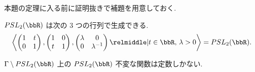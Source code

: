 \documentclass[openany, a4paper, oneside]{jsbook}
\begin{document}
本題の定理に入る前に証明抜きで補題を用意しておく.
\begin{lem}\label{introduction-to-ergodic-theory7}
$PSL_2 (\bbR)$ は次の 3 つの行列で生成できる.
\begin{align}
 \left\langle
 \begin{pmatrix}
  1 & t \\
  0 & 1
 \end{pmatrix},
 \begin{pmatrix}
  1 & 0 \\
  t & 1
 \end{pmatrix},
 \begin{pmatrix}
  \lambda & 0 \\
  0       &  \lambda^{-1}
 \end{pmatrix}
 \relmiddle| t \in \bbR, \, \lambda > 0
 \right\rangle
 =
 PSL_2 (\bbR).
\end{align}
\end{lem}
\begin{lem}\label{introduction-to-ergodic-theory8}
$\Gamma \setminus PSL_2 (\bbR)$ 上の $PSL_2 (\bbR)$ 不変な関数は定数しかない.
\end{lem}
\end{document}
